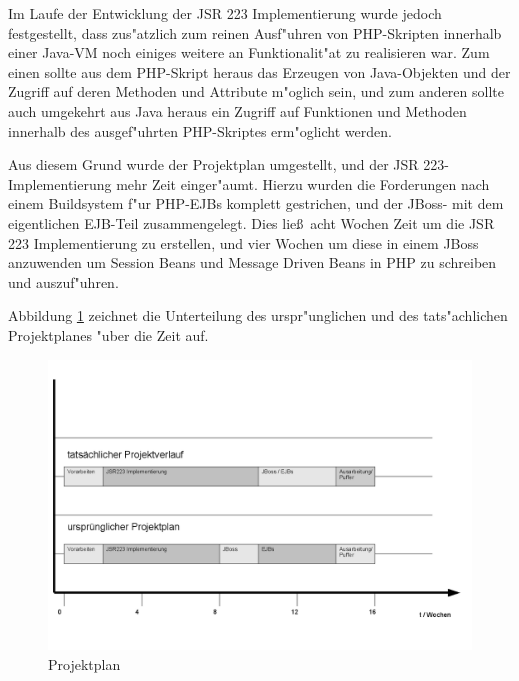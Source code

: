 Im Laufe der Entwicklung der JSR 223 Implementierung wurde jedoch festgestellt, dass zus"atzlich zum reinen Ausf"uhren von PHP-Skripten
innerhalb einer Java-VM noch einiges weitere an Funktionalit"at zu realisieren war. Zum einen sollte aus dem PHP-Skript heraus das Erzeugen
von Java-Objekten und der Zugriff auf deren Methoden und Attribute m"oglich sein, und zum anderen sollte auch umgekehrt aus Java heraus ein
Zugriff auf Funktionen und Methoden innerhalb des ausgef"uhrten PHP-Skriptes erm"oglicht werden.

Aus diesem Grund wurde der Projektplan umgestellt, und der JSR 223-Implementierung mehr Zeit einger"aumt. Hierzu wurden die Forderungen nach
einem Buildsystem f"ur PHP-EJBs komplett gestrichen, und der JBoss- mit dem eigentlichen EJB-Teil zusammengelegt. Dies lie\ss\ acht Wochen
Zeit um die JSR 223 Implementierung zu erstellen, und vier Wochen um diese in einem JBoss anzuwenden um Session Beans und Message Driven
Beans in PHP zu schreiben und auszuf"uhren. 

Abbildung \ref{fig:plan} zeichnet die Unterteilung des urspr"unglichen und des tats"achlichen Projektplanes "uber die Zeit auf.

\begin{figure}[h]
\includegraphics[width=\textwidth]{javanscripts/img/plan.png}
\caption{Projektplan}
\label{fig:plan}
\end{figure}



